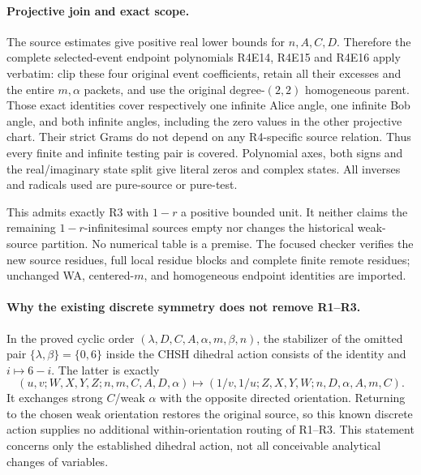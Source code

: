\paragraph{Projective join and exact scope.}
The source estimates give positive real lower bounds for $n,A,C,D$.
Therefore the complete selected-event endpoint polynomials R4E14,
R4E15 and R4E16 apply verbatim: clip these four original event
coefficients, retain all their excesses and the entire $m,\alpha$
packets, and use the original degree-$(2,2)$ homogeneous parent.
Those exact identities cover respectively one infinite Alice angle,
one infinite Bob angle, and both infinite angles, including the
zero values in the other projective chart. Their strict Grams do
not depend on any R4-specific source relation. Thus every finite
and infinite testing pair is covered. Polynomial axes, both signs
and the real/imaginary state split give literal zeros and complex
states. All inverses and radicals used are pure-source or pure-test.

This admits exactly R3 with $1-r$ a positive bounded unit. It neither
claims the remaining $1-r$-infinitesimal sources empty nor changes
the historical weak-source partition. No numerical table is a
premise. The focused checker verifies the new source residues, full
local residue blocks and complete finite remote residues; unchanged
WA, centered-$m$, and homogeneous endpoint identities are imported.

\paragraph{Why the existing discrete symmetry does not remove R1--R3.}
In the proved cyclic order $(\lambda,D,C,A,\alpha,m,\beta,n)$,
the stabilizer of the omitted pair $\{\lambda,\beta\}=\{0,6\}$
inside the CHSH dihedral action consists of the identity and
$i\mapsto6-i$. The latter is exactly
\[
 (u,v;W,X,Y,Z;n,m,C,A,D,\alpha)
 \longmapsto(1/v,1/u;Z,X,Y,W;n,D,\alpha,A,m,C).
\]
It exchanges strong $C$/weak $\alpha$ with the opposite directed
orientation. Returning to the chosen weak orientation restores the
original source, so this known discrete action supplies no additional
within-orientation routing of R1--R3. This statement concerns only
the established dihedral action, not all conceivable analytical
changes of variables.
